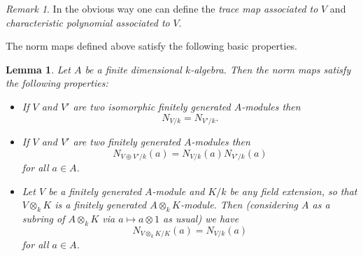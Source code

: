 \documentclass[11pt]{amsart}
\numberwithin{equation}{section}
\newtheorem{lemma}[equation]{Lemma}
\theoremstyle{remark}
\newtheorem{remark}[equation]{Remark}
\theoremstyle{remark}
\theoremstyle{remark}
\theoremstyle{definition}
\theoremstyle{definition}
\theoremstyle{definition}
\theoremstyle{definition}
\theoremstyle{definition}
\theoremstyle{definition}
\begin{document}
\begin{remark}
In the obvious way one can define the \textit{trace map associated to }$V$ and \textit{characteristic polynomial associated to }$V$. %
\end{remark}

The norm maps defined above satisfy the following basic properties.

\begin{lemma} \label{basic norm properties}
Let $A$ be a finite dimensional $k$-algebra. Then the norm maps satisfy the following properties:
\begin{itemize}
\item[(1)] If $V$ and $V'$ are two isomorphic finitely generated $A$-modules then 
\[N_{V/k}=N_{V'/k}.\]
\item[(2)] If $V$ and $V'$ are two finitely generated $A$-modules  then \[N_{V\oplus V'/k}(a)=N_{V/k}(a)N_{V'/k}(a)\]
for all $a\in A$.
\item[(3)] Let $V$ be a finitely generated $A$-module and $K/k$ be any field extension, so that $V\otimes_k K$ is a finitely generated $A\otimes_k K$-module. Then (considering $A$ as a subring of $A\otimes_k K$ via $a\mapsto a\otimes 1$ as usual) we have 
\[N_{V\otimes_k K/K}(a)=N_{V/k}(a)\]
for all $a\in A$.
\end{itemize}
\end{lemma}
\end{document}

